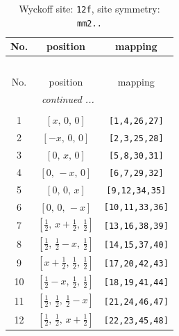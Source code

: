 \documentclass[fleqn,8pt]{jsarticle}
\begin{document}
\begin{longtable}{ccc}
\caption{Wyckoff site: {\tt 12f}, site symmetry: {\tt mm2..}}
 \\
 \hline \hline
No. & position & mapping \\ \hline \endfirsthead

\multicolumn{2}{l}{\tablename\ \thetable{}} \\
 \hline \hline
No. & position & mapping \\ \hline \endhead

 \hline \hline
\multicolumn{2}{r}{\footnotesize\it continued ...} \\ \endfoot

 \hline \hline
\multicolumn{2}{r}{} \\ \endlastfoot

1 & $\left[ x,\, 0,\, 0 \right]$ & {\tt [1,4,26,27]} \\ \hline
2 & $\left[ - x,\, 0,\, 0 \right]$ & {\tt [2,3,25,28]} \\ \hline
3 & $\left[ 0,\, x,\, 0 \right]$ & {\tt [5,8,30,31]} \\ \hline
4 & $\left[ 0,\, - x,\, 0 \right]$ & {\tt [6,7,29,32]} \\ \hline
5 & $\left[ 0,\, 0,\, x \right]$ & {\tt [9,12,34,35]} \\ \hline
6 & $\left[ 0,\, 0,\, - x \right]$ & {\tt [10,11,33,36]} \\ \hline
7 & $\left[ \frac{1}{2},\, x + \frac{1}{2},\, \frac{1}{2} \right]$ & {\tt [13,16,38,39]} \\ \hline
8 & $\left[ \frac{1}{2},\, \frac{1}{2} - x,\, \frac{1}{2} \right]$ & {\tt [14,15,37,40]} \\ \hline
9 & $\left[ x + \frac{1}{2},\, \frac{1}{2},\, \frac{1}{2} \right]$ & {\tt [17,20,42,43]} \\ \hline
10 & $\left[ \frac{1}{2} - x,\, \frac{1}{2},\, \frac{1}{2} \right]$ & {\tt [18,19,41,44]} \\ \hline
11 & $\left[ \frac{1}{2},\, \frac{1}{2},\, \frac{1}{2} - x \right]$ & {\tt [21,24,46,47]} \\ \hline
12 & $\left[ \frac{1}{2},\, \frac{1}{2},\, x + \frac{1}{2} \right]$ & {\tt [22,23,45,48]} \\
\end{longtable}
\renewcommand{\arraystretch}{1.2}
\end{document}
